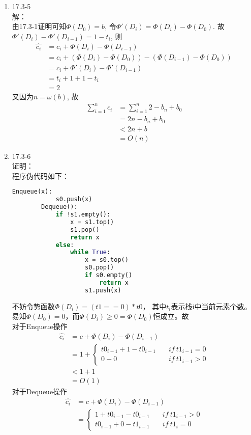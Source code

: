 \documentclass[UTF8]{ctexart}
\begin{document}
\begin{enumerate}
	\item 17.3-5 \\
	解：\\
	由17.3-1证明可知$\Phi(D_0) = b$, 令$\Phi'(D_i) = \Phi(D_i) - \Phi(D_0)$. 故$\Phi'(D_i) - \Phi'(D_{i-1}) = 1 - t_i$, 则\\
	\begin{align*}
		\hat{c_i}	&= c_i + \Phi(D_i) - \Phi(D_{i-1})	\\
					&= c_i + (\Phi(D_i) - \Phi(D_0)) - (\Phi(D_{i-1}) - \Phi(D_0))	\\
					&= c_i + \Phi'(D_i) - \Phi'(D_{i-1})	\\
					&= t_i + 1 + 1 - t_i	\\
					&= 2
	\end{align*}
	又因为$n = \omega(b)$, 故
	\begin{align*}
		\sum_{i=1}^n c_i	&= \sum_{i=1}^n 2 - b_n + b_0	\\
							&= 2n - b_n + b_0	\\
							&< 2n + b	\\
							&= O(n)
	\end{align*}
	
	\item 17.3-6 \\
	证明：\\
	程序伪代码如下：
	\begin{lstlisting}[language=Python]
		Enqueue(x):
			s0.push(x)
		Dequeue():
			if !s1.empty():
				x = s1.top()
				s1.pop()
				return x
			else:
				while True:
					x = s0.top()
					s0.pop()
					if s0.empty()
						return x
					s1.push(x)	
	\end{lstlisting}
	不妨令势函数$\Phi(D_i) = (t1==0)*t0$，
	其中$t_i$表示栈i中当前元素个数。
	易知$\Phi(D_0) = 0$，而$\Phi(D_i) \ge 0 = \Phi(D_0)$恒成立。故\\
	对于Enqueue操作
	\begin{align*}
		\hat{c_i}	&= c + \Phi(D_i) - \Phi(D_{i-1})	\\
					&= 1 +	\left\{
								\begin{aligned}
									t0_{i-1}+1 - t0_{i-1}	&\quad if \ t1_{i-1}=0	\\
									0 - 0	&\quad if \ t1_{i-1}>0
								\end{aligned}
							\right.	\\
					&< 1 + 1	\\
					&= O(1)
	\end{align*}
	对于Dequeue操作
	\begin{align*}
		\hat{c_i}	&= c + \Phi(D_i) - \Phi(D_{i-1})	\\
					&=	\left\{
							\begin{aligned}
								1 + t0_{i-1} - t0_{i-1}	&\quad if \ t1_{i-1}>0	\\
								t0_{i-1} + 0 - t1_{i-1} &\quad if \ t1_i=0
							\end{aligned}
						\right.	\\
					&
	\end{align*}
	
\end{enumerate}
\end{document}
